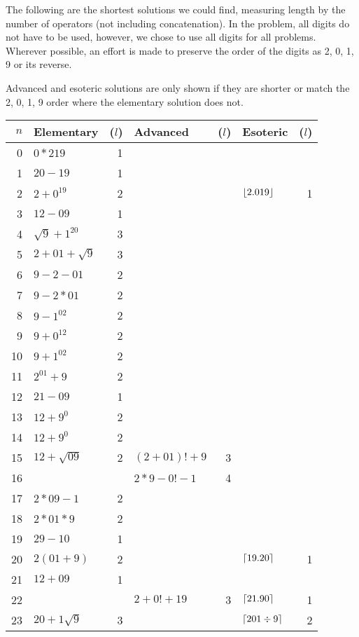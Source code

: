 The following are the shortest solutions we could find, measuring length by the number of operators (not including concatenation).
In the problem, all digits do not have to be used, however, we chose to use all digits for all problems.
Wherever possible, an effort is made to preserve the order of the digits as 2, 0, 1, 9 or its reverse.

Advanced and esoteric solutions are only shown if they are shorter or match the 2, 0, 1, 9 order where the elementary solution does not.

\begin{longtable}{r l r l r l r}
\toprule
$n$ & Elementary & ($l$) & Advanced & ($l$) & Esoteric & ($l$) \\ \midrule
\endhead%
0 & $0*219$ & 1 \\ \midrule
1 & $20-19$ & 1 \\ \midrule
2 & $2+0^{19}$ & 2 & & & $\lfloor2.019\rfloor$ & 1 \\ \midrule
3 & $12-09$ & 1 \\ \midrule
4 & $\sqrt{9}+1^{20}$ & 3 \\ \midrule
5 & $2+01+\sqrt{9}$ & 3 \\ \midrule
6 & $9-2-01$ & 2 \\ \midrule
7 & $9-2*01$ & 2 \\ \midrule
8 & $9-1^{02}$ & 2 \\ \midrule
9 & $9+0^{12}$ & 2 \\ \midrule
\midrule
10 & $9+1^{02}$ & 2 \\ \midrule
11 & $2^{01}+9$ & 2 \\ \midrule
12 & $21-09$ & 1 \\ \midrule
13 & $12+9^0$ & 2 \\ \midrule
14 & $12+9^0$ & 2 \\ \midrule
15 & $12+\sqrt{09}$ & 2 & $(2+01)!+9$ & 3 \\ \midrule
16 & & & $2*9-0!-1$ & 4 \\ \midrule
17 & $2*09-1$ & 2& \\ \midrule
18 & $2*01*9$ & 2 \\ \midrule
19 & $29-10$ & 1 \\ \midrule
\midrule
20 & $2(01+9)$ & 2 & & & $\lceil19.20\rceil$ & 1 \\ \midrule
21 & $12+09$ & 1 \\ \midrule
22 & & & $2+0!+19$ & 3 & $\lceil21.90\rceil$ & 1 \\ \midrule
23 & $20+1\sqrt{9}$ & 3 & & & $\lceil201\div9\rceil$ & 2 \\ \midrule

\end{longtable}
